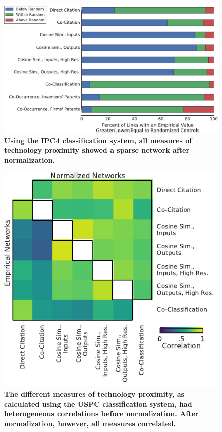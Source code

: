 \documentclass[]{svjour3}
\begin{document}
\begin{figure}[p!]
\centering
\includegraphics[width=.7\textwidth]{figs/Related_Unrelated_Percentages_Two_Column_IPC4.pdf} 
\caption{\textbf{Using the IPC4 classification system, all measures of technology proximity showed a sparse network after normalization.}}\label{related_unrelated_percentage_IPC4}
\end{figure}

\begin{figure}[p!]
\centering
\includegraphics[width=.7\textwidth]{figs/Network_Correlations_Linear_USPC.pdf} 
\caption{\textbf{The different measures of technology proximity, as calculated using the USPC classification system, had heterogeneous correlations before normalization. After normalization, however, all measures correlated.}}\label{Network_Correlations_Linear_USPC}
\end{figure}
\end{document}
